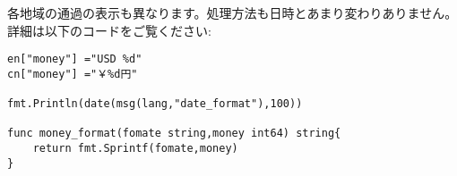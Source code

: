 各地域の通過の表示も異なります。処理方法も日時とあまり変わりありません。詳細は以下のコードをご覧ください:

\begin{lstlisting}[numbers=none]
en["money"] ="USD %d"
cn["money"] ="￥%d円"

fmt.Println(date(msg(lang,"date_format"),100))

func money_format(fomate string,money int64) string{
    return fmt.Sprintf(fomate,money)
}
\end{lstlisting}
